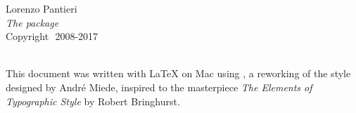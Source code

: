 
\thispagestyle{empty}

\hfill


\begin{center}
Lorenzo Pantieri \\
\smallskip
\textit{The \arsclassica{} package}\\
\smallskip
Copyright\,\textcopyright\ 2008-2017
\end{center}

\medskip

\noindent\textsf{} \\
\noindent
This document was written with \LaTeX{} on Mac using \arsclassica, a reworking of the \classicthesis{} style designed by Andr\'e Miede, inspired to the masterpiece \emph{The Elements of Typographic Style} by Robert Bringhurst. 

\bigskip

\noindent
\textsf{}

\noindent
{}\,